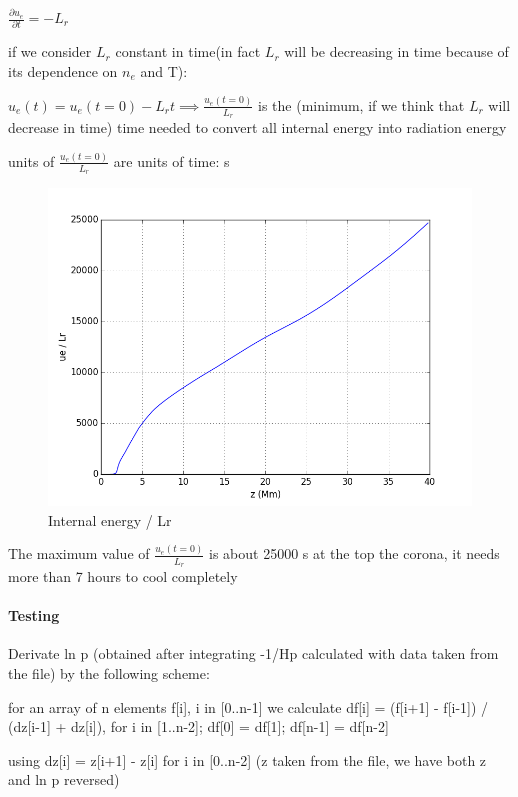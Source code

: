 \documentclass[10pt]{book}
\begin{document}
$ \frac{\partial u_e}{\partial t} = -L_r$

if we consider $L_r$ constant in time(in fact $L_r$ will be decreasing in time because of its dependence on $n_e$ and T):

$u_e(t) = u_e(t=0) - L_r t \implies \frac{u_e(t=0)}{L_r}$ is the (minimum, if we think that
$L_r$ will decrease in time) time needed to convert all internal energy into radiation energy

units of $\frac{u_e(t=0)}{L_r}$ are units of time: s

\begin{figure}[H]
 \centering
 \includegraphics[scale=0.5]{ueDivLr.png}
 \caption{ Internal energy / Lr}
\end{figure}

The maximum value of $\frac{u_e(t=0)}{L_r} $ is about 25000 s at the top the corona, it needs more than  7 hours to cool completely

\paragraph{Testing}

Derivate ln p (obtained after integrating -1/Hp calculated with data taken from the file) by the following scheme:

for an array of n elements f[i], i in [0..n-1]
we calculate
df[i] = (f[i+1] - f[i-1]) / (dz[i-1] + dz[i]), for i in [1..n-2];
df[0] = df[1];
df[n-1] = df[n-2]

using dz[i] = z[i+1] - z[i] for i in [0..n-2]  (z taken from the file, we have both z and ln p reversed)
\end{document}
